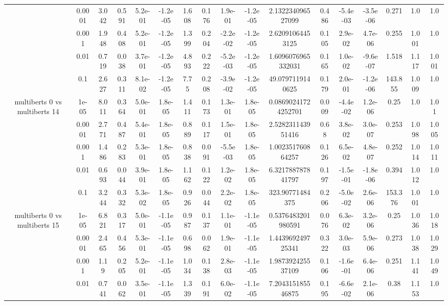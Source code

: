 \begin{tabular}{|c|c|c|c|c|c|c|c|c|c|c|c|c|c|c|c|c|}
 & 0.0001 & 3.042 & 0.591 & 5.2e-01 & -1.2e-05 & 1.608 & 0.176 & 1.9e-01 & -1.2e-05 & 2.132234096527099 & 0.486 & -5.4e-03 & -3.5e-06 & 0.271 & 1.0 & 1.0 \\
 & 0.001 & 1.948 & 0.408 & 5.2e-01 & -1.2e-05 & 1.399 & 0.204 & -2.2e-02 & -1.2e-05 & 2.62091064453125 & 0.105 & 2.9e-02 & 4.7e-06 & 0.255 & 1.001 & 1.0 \\
 & 0.01 & 0.719 & 0.038 & 3.7e-01 & -1.2e-05 & 4.893 & 0.222 & -5.2e-03 & -1.2e-05 & 1.6096076965332031 & 0.165 & 1.0e-02 & -9.6e-07 & 1.518 & 1.117 & 1.001 \\
 & 0.1 & 2.627 & 0.311 & 8.1e-02 & -1.2e-05 & 7.75 & 0.208 & -3.9e-02 & -1.2e-05 & 49.0797119140625 & 0.179 & 2.0e-01 & -1.2e-06 & 143.855 & 1.009 & 1.0 \\
\hline
\multirow{5}{*}{multiberts 0 vs multiberts 14} & 1e-05 & 8.011 & 0.364 & 5.0e-01 & 1.8e-05 & 1.411 & 0.173 & 1.3e-01 & 1.8e-05 & 0.08690241724252701 & 0.009 & -4.4e-02 & 1.2e-06 & 0.25 & 1.0 & 1.01 \\
 & 0.0001 & 2.771 & 0.487 & 5.4e-01 & 1.8e-05 & 0.889 & 0.117 & 1.5e-01 & 1.8e-05 & 2.528231143951416 & 0.68 & 3.8e-02 & 3.0e-07 & 0.253 & 1.098 & 1.005 \\
 & 0.001 & 1.486 & 0.283 & 5.3e-01 & 1.8e-05 & 0.838 & 0.091 & -5.5e-03 & 1.8e-05 & 1.002351760864257 & 0.126 & 6.5e-02 & 4.8e-07 & 0.252 & 1.014 & 1.011 \\
 & 0.01 & 0.693 & 0.044 & 3.9e-01 & 1.8e-05 & 1.162 & 0.122 & 1.2e-02 & 1.8e-05 & 6.321788787841797 & 0.197 & -1.5e-01 & -1.8e-06 & 0.394 & 1.012 & 1.0 \\
 & 0.1 & 3.244 & 0.332 & 5.3e-02 & 1.8e-05 & 0.926 & 0.044 & 2.2e-02 & 1.8e-05 & 323.90771484375 & 0.206 & -5.0e-02 & 2.6e-06 & 153.376 & 1.001 & 1.0 \\
\hline
\multirow{5}{*}{multiberts 0 vs multiberts 15} & 1e-05 & 6.821 & 0.317 & 5.0e-01 & -1.1e-05 & 0.987 & 0.137 & 1.1e-01 & -1.1e-05 & 0.5376483201980591 & 0.076 & 6.3e-02 & 3.2e-06 & 0.25 & 1.036 & 1.018 \\
 & 0.0001 & 2.465 & 0.456 & 5.3e-01 & -1.1e-05 & 0.698 & 0.062 & 1.9e-01 & -1.1e-05 & 1.443969249725341 & 0.322 & 3.0e-03 & 5.9e-06 & 0.273 & 1.038 & 1.029 \\
 & 0.001 & 1.19 & 0.205 & 5.2e-01 & -1.1e-05 & 1.034 & 0.138 & 2.8e-03 & -1.1e-05 & 1.987392425537109 & 0.106 & -1.6e-01 & 6.4e-06 & 0.251 & 1.141 & 1.049 \\
 & 0.01 & 0.741 & 0.062 & 3.5e-01 & -1.1e-05 & 1.339 & 0.191 & 6.0e-02 & -1.1e-05 & 7.204315185546875 & 0.195 & -6.6e-02 & 2.1e-06 & 0.38 & 1.153 & 1.0 \\

\end{tabular}
